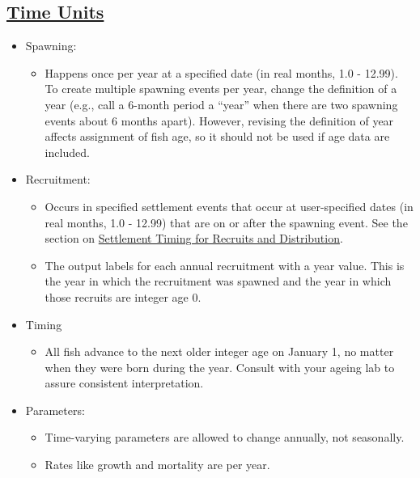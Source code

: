 \subsection[Time Units]{\protect\hyperlink{RecrTiming}{Time Units}}
	\begin{itemize}
		\item Spawning: 
		\begin{itemize}
			\item Happens once per year at a specified date (in real months, 1.0 - 12.99). To create multiple spawning events per year, change the definition of a year (e.g., call a 6-month period a ``year'' when there are two spawning events about 6 months apart). However, revising the definition of year affects assignment of fish age, so it should not be used if age data are included.
		\end{itemize}
		
		\item Recruitment: 
		\begin{itemize}
			\item Occurs in specified settlement events that occur at user-specified dates (in real months, 1.0 - 12.99) that are on or after the spawning event. See the section on \hyperlink{SettlementTiming}{Settlement Timing for Recruits and Distribution}.
			\item The output labels for each annual recruitment with a year value. This is the year in which the recruitment was spawned and the year in which those recruits are integer age 0.
		\end{itemize}
		\item Timing
		\begin{itemize}
			\item All fish advance to the next older integer age on January 1, no matter when they were born during the year. Consult with your ageing lab to assure consistent interpretation.
		\end{itemize}		

		\item Parameters:
		\begin{itemize}
			\item Time-varying parameters are allowed to change annually, not seasonally.
			\item Rates like growth and mortality are per year.
		\end{itemize}
	\end{itemize}

\hypertarget{Seasons}{}
